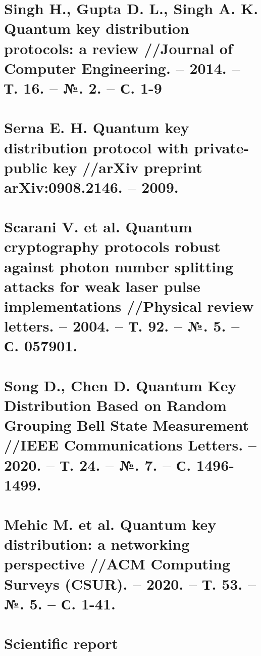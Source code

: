 \clearpage
\section{Singh H., Gupta D. L., Singh A. K. Quantum key distribution protocols: a review //Journal of Computer Engineering. – 2014. – Т. 16. – №. 2. – С. 1-9 \\ }


\clearpage
\section{Serna E. H. Quantum key distribution protocol with private-public key //arXiv preprint arXiv:0908.2146. – 2009. }


\clearpage
\section{Scarani V. et al. Quantum cryptography protocols robust against photon number splitting attacks for weak laser pulse implementations //Physical review letters. – 2004. – Т. 92. – №. 5. – С. 057901. }


\clearpage
\section{Song D., Chen D. Quantum Key Distribution Based on Random Grouping Bell State Measurement //IEEE Communications Letters. – 2020. – Т. 24. – №. 7. – С. 1496-1499. }


%

\clearpage
\section{Mehic M. et al. Quantum key distribution: a networking perspective //ACM Computing Surveys (CSUR). – 2020. – Т. 53. – №. 5. – С. 1-41. }


\clearpage
\section{Scientific report}

